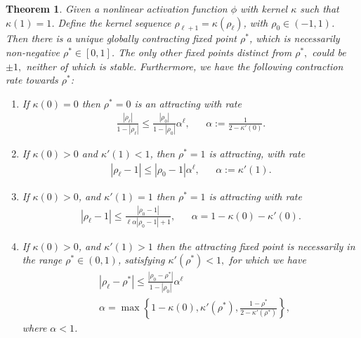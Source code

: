 \documentclass[twoside]{article}
\newtheorem{theorem}{Theorem}
\theoremstyle{definition}
\newcommand{\thomas}[1]{{\color{blue}TH:  \textit{#1}}}
\begin{document}
\begin{theorem}
\label{thm:global_attract}
Given a nonlinear activation function $\phi$ with kernel  $\kappa$ such that $\kappa(1)=1$. Define the kernel sequence $\rho_{\ell+1}=\kappa(\rho_\ell)$, with $\rho_0 \in (-1,1)$. Then there is a unique globally contracting fixed point $\rho^*$, which is necessarily non-negative $\rho^*\in[0,1]$. The only other fixed points distinct from $\rho^*,$ could be $\pm 1,$ neither of which is stable. Furthermore, we have the following contraction rate towards $\rho^*$:
\begin{enumerate}
    \item If $\kappa(0)=0$ then $\rho^*=0$ is an attracting with rate 
    \begin{align*}
    \frac{|\rho_\ell|}{1-|\rho_\ell|} \le \frac{|\rho_0|}{1-|\rho_0|} \alpha^\ell, && \alpha:=\frac{1}{2-\kappa'(0)}.
    \end{align*}
    \item If $\kappa(0)>0$ and $\kappa'(1)<1$, then $\rho^*=1$ is attracting, with rate 
    \begin{align*}
    |\rho_\ell-1| \le |\rho_0-1| \alpha ^\ell, && \alpha := \kappa'(1).
    \end{align*}
    \item If $\kappa(0) > 0$, and $\kappa'(1)=1$ then  $\rho^*=1$ is attracting with rate 
    \begin{align*}
    |\rho_\ell-1| \le \frac{|\rho_0-1|}{\ell\alpha|\rho_0-1|+1}, && \alpha = 1-\kappa(0)-\kappa'(0).
    \end{align*}
    \item If $\kappa(0) > 0$, and $\kappa'(1)>1$ then the attracting fixed point is necessarily in the range $\rho^*\in(0,1)$, satisfying $\kappa'(\rho^*) < 1,$ for which we have  
    \begin{align*}
    &|\rho_\ell-\rho^*| \le \frac{|\rho_0-\rho^*|}{1-|\rho_0|}\alpha^\ell \\ &\alpha = \max\left\{1-\kappa(0),\kappa'(\rho^*),\frac{1-\rho^*}{2-\kappa'(\rho^*)}\right\},
    \end{align*}
    where $\alpha<1$.
\end{enumerate}
\end{theorem}
\end{document}
